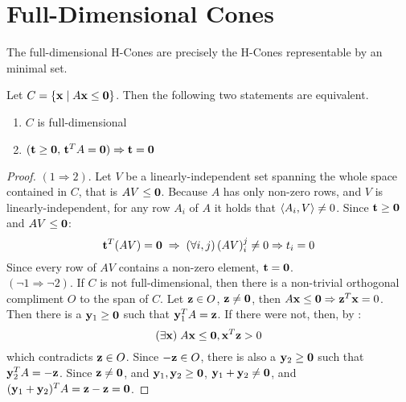 \section{Full-Dimensional Cones}

\begin{Prop}\label{minimal_hcones}
	The full-dimensional H-Cones are precisely the H-Cones representable by an minimal set.
\end{Prop}

\begin{Lemma}\label{full_independence}
	Let $C = \left\{\mathbf{x}\;|\; A\mathbf{x}\leq\mathbf{0}\right\}$.  Then the following two statements are equivalent.
	\begin{enumerate}
		\item $C$ is full-dimensional
		\item $(\mathbf{t}\geq\mathbf{0},\,\mathbf{t}^T A=\mathbf{0})\Rightarrow \mathbf{t}=\mathbf{0}$
	\end{enumerate}
\end{Lemma}

\begin{proof}
	$(1\Rightarrow 2)$.  Let $V$ be a linearly-independent set spanning the whole space contained in $C$, that is $AV\leq\mathbf{0}$.  Because $A$ has only non-zero rows, and $V$ is linearly-independent, for any row $A_i$ of $A$ it holds that $\left\langle A_i, V \right\rangle \neq 0$.  Since $\mathbf{t}\geq\mathbf{0}$ and $AV\leq\mathbf{0}$:
	\[ \mathbf{t}^T(AV) = \mathbf{0} \;\Rightarrow\; (\forall i,j)\,(AV)_i^j \neq 0 \Rightarrow t_i = 0\]
	Since every row of $AV$ contains a non-zero element, $\mathbf{t}=\mathbf{0}$.\\
	$(\neg 1\Rightarrow\neg 2)$.  If $C$ is not full-dimensional, then there is a non-trivial orthogonal compliment $O$ to the span of $C$.  Let $\mathbf{z}\in O$, $\mathbf{z}\neq\mathbf{0}$, then $A\mathbf{x}\leq\mathbf{0} \Rightarrow \mathbf{z}^T\mathbf{x} = 0$.  Then there is a $\mathbf{y}_1\geq\mathbf{0}$ such that $\mathbf{y}_1^T A = \mathbf{z}$.  If there were not, then, by :
	\[ (\exists \mathbf{x})\;A\mathbf{x}\leq\mathbf{0}, \mathbf{x}^T\mathbf{z} > 0 \]
	which contradicts $\mathbf{z}\in O$.  Since $-\mathbf{z}\in O$, there is also a $\mathbf{y}_2\geq\mathbf{0}$ such that $\mathbf{y}_2^T A = -\mathbf{z}$.  Since $\mathbf{z}\neq\mathbf{0}$, and $\mathbf{y}_1,\mathbf{y}_2\geq\mathbf{0}$, $\mathbf{y}_1+\mathbf{y}_2\neq\mathbf{0}$, and $(\mathbf{y}_1+\mathbf{y}_2)^T A = \mathbf{z}-\mathbf{z} = \mathbf{0}$.
\end{proof}

